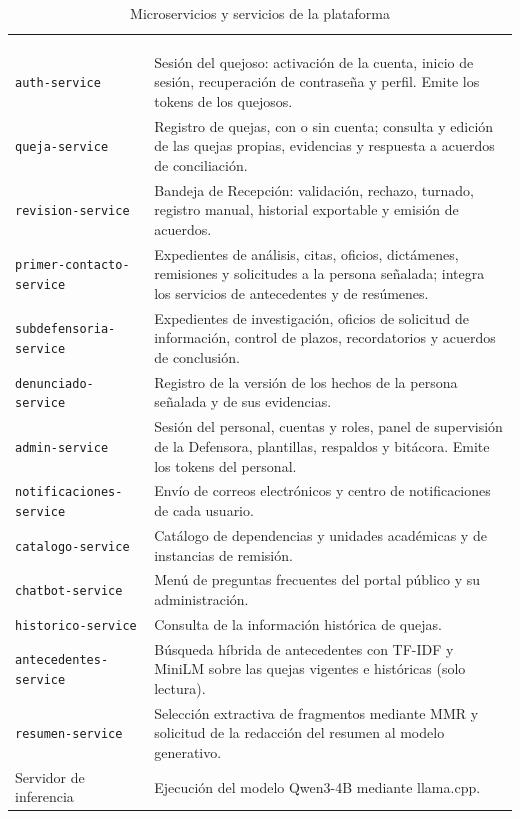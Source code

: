 \small
\renewcommand{\arraystretch}{1.2}
\setlength{\tabcolsep}{4pt}
\begin{longtable}{|L{4.6cm}|L{11.0cm}|}
	\hiderowcolors\caption{Microservicios y servicios de la plataforma}
	\label{tab:microservicios} \\ \showrowcolors
	\hline
	 &  \\
	\hline
	\endfirsthead
	\hline
	 &  \\
	\hline
	\endhead
	\texttt{auth-service} & Sesión del quejoso: activación de la cuenta, inicio de sesión, recuperación de contraseña y perfil. Emite los tokens de los quejosos. \\ \hline
	\texttt{queja-service} & Registro de quejas, con o sin cuenta; consulta y edición de las quejas propias, evidencias y respuesta a acuerdos de conciliación. \\ \hline
	\texttt{revision-service} & Bandeja de Recepción: validación, rechazo, turnado, registro manual, historial exportable y emisión de acuerdos. \\ \hline
	\texttt{primer-contacto-service} & Expedientes de análisis, citas, oficios, dictámenes, remisiones y solicitudes a la persona señalada; integra los servicios de antecedentes y de resúmenes. \\ \hline
	\texttt{subdefensoria-service} & Expedientes de investigación, oficios de solicitud de información, control de plazos, recordatorios y acuerdos de conclusión. \\ \hline
	\texttt{denunciado-service} & Registro de la versión de los hechos de la persona señalada y de sus evidencias. \\ \hline
	\texttt{admin-service} & Sesión del personal, cuentas y roles, panel de supervisión de la Defensora, plantillas, respaldos y bitácora. Emite los tokens del personal. \\ \hline
	\texttt{notificaciones-service} & Envío de correos electrónicos y centro de notificaciones de cada usuario. \\ \hline
	\texttt{catalogo-service} & Catálogo de dependencias y unidades académicas y de instancias de remisión. \\ \hline
	\texttt{chatbot-service} & Menú de preguntas frecuentes del portal público y su administración. \\ \hline
	\texttt{historico-service} & Consulta de la información histórica de quejas. \\ \hline
	\texttt{antecedentes-service} & Búsqueda híbrida de antecedentes con TF-IDF y MiniLM sobre las quejas vigentes e históricas (solo lectura). \\ \hline
	\texttt{resumen-service} & Selección extractiva de fragmentos mediante MMR y solicitud de la redacción del resumen al modelo generativo. \\ \hline
	Servidor de inferencia & Ejecución del modelo Qwen3-4B mediante llama.cpp. \\ \hline
\end{longtable}
\normalsize
\setlength{\tabcolsep}{6pt}
\renewcommand{\arraystretch}{1}

